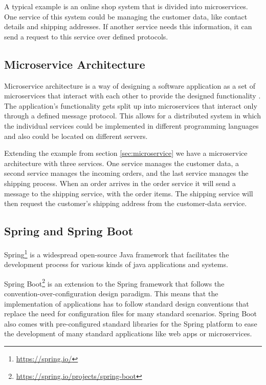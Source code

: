 A typical example is an online shop system that is divided into microservices.
One service of this system could be managing the customer data, like contact details and shipping addresses.
If another service needs this information, it can send a request to this service over defined protocols.


\subsection{Microservice Architecture}
\label{sec:microservice_architecture}
Microservice architecture is a way of designing a software application as a set of microservices that interact with each other to provide the designed functionality \cite{dragoniMicroservicesYesterdayToday2017, MicroservicesHttpsMartinfowler}.
The application's functionality gets split up into microservices that interact only through a defined message protocol.
This allows for a distributed system in which the individual services could be implemented in different programming languages and also could be located on different servers.

Extending the example from section \ref{sec:microservice} we have a microservice architecture with three services.
One service manages the customer data, a second service manages the incoming orders, and the last service manages the shipping process.
When an order arrives in the order service it will send a message to the shipping service, with the order items.
The shipping service will then request the customer's shipping address from the customer-data service.


\subsection{Spring and Spring Boot}
\label{sec:spring}
Spring\footnote{\url{https://spring.io/}} is a widespread open-source Java framework that facilitates the development process for various kinds of java applications and systems.

Spring Boot\footnote{\url{https://spring.io/projects/spring-boot}} is an extension to the Spring framework that follows the convention-over-configuration design paradigm.
This means that the implementation of applications has to follow standard design conventions that replace the need for configuration files for many standard scenarios.
Spring Boot also comes with pre-configured standard libraries for the Spring platform to ease the development of many standard applications like web apps or microservices.

